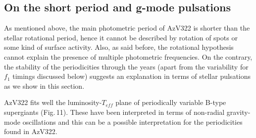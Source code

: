 \documentclass[useAMS,usenatbib]{mn2e}
\begin{document}
\subsection{On the short period and g-mode  pulsations}

As mentioned above, the main photometric period of AzV322 is shorter than the stellar rotational period, hence it cannot be 
described by rotation of spots or some kind of surface activity. Also, as said before, the rotational hypothesis cannot explain the presence of multiple 
photometric frequencies. On the contrary,  
the stability of the periodicities through the years (apart from the variability for $f_1$ timings discussed below) suggests an explanation in terms of stellar pulsations as we show in this section.




AzV322 fits well  the luminosity-$T_{eff}$ plane of periodically variable B-type supergiants (Fig.\,11). These have been interpreted in terms of non-radial gravity-mode oscillations \citep{2006ApJ...650.1111S, 2007A&A...463.1093L, 2015MNRAS.447.2378O} and this can be a possible interpretation for the periodicities found in  AzV322.






\end{document}
